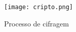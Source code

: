 \begin{figure}[h]
    \caption{\label{fig_cifragem}Processo de cifragem}
    \vspace{5pt}
    \centering
    \texttt{[image: cripto.png]}
    \vspace{5pt}
\end{figure}

